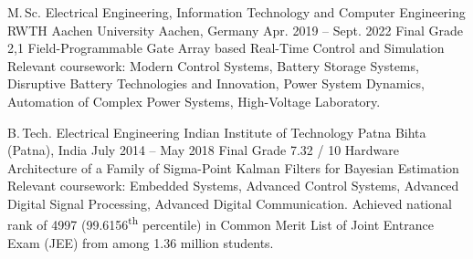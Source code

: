 \begin{cveducation}

\cvschool
	{M.\,Sc.} %
	{Electrical Engineering, Information Technology and Computer Engineering} %
	{RWTH Aachen University} %
	{Aachen, Germany  {\acvHeaderIconSep{}} {} } %
	{Apr. 2019 -- Sept. 2022  {\acvHeaderIconSep{}} {} } %
	{Final Grade 2,1  {\acvHeaderIconSep{}} {} } %
	{Field-Programmable Gate Array based Real-Time Control and Simulation} %
	{Relevant coursework: Modern Control Systems, Battery Storage Systems, Disruptive Battery Technologies and Innovation, Power System Dynamics, Automation of Complex Power Systems, High-Voltage Laboratory.} %

\cvschool
	{B.\,Tech.} %
	{Electrical Engineering} %
	{Indian Institute of Technology Patna} %
	{Bihta (Patna), India  {\acvHeaderIconSep{}} {} } %
	{July 2014 -- May 2018  {\acvHeaderIconSep{}} {} } %
	{Final Grade 7.32 / 10  {\acvHeaderIconSep{}} {} } %
	{Hardware Architecture of a Family of Sigma-Point Kalman Filters for Bayesian Estimation} %
	{Relevant coursework: Embedded Systems, Advanced Control Systems, Advanced Digital Signal Processing, Advanced Digital Communication.\newline{} {\acvHeaderIconSep} {} Achieved national rank of 4997 (99.6156\textsuperscript{th} percentile) in Common Merit List of Joint Entrance Exam (JEE) from among 1.36 million students.} %



\end{cveducation}
